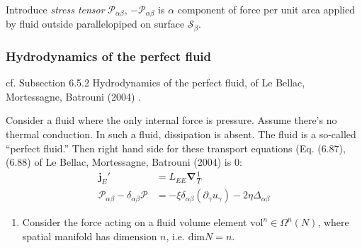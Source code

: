 \documentclass[10pt]{amsart}
\begin{document}
\begin{multicols*}{2}
Introduce \emph{stress tensor} $\mathcal{P}_{\alpha \beta}$, $-\mathcal{P}_{\alpha \beta}$ is $\alpha$ component of force per unit area applied by fluid outside parallelopiped on surface $\mathcal{S}_{\beta}$.  









\subsubsection{Hydrodynamics of the perfect fluid}

cf. Subsection 6.5.2 Hydrodynamics of the perfect fluid, of Le Bellac, Mortessagne, Batrouni (2004) \cite{MLeBellacFMortessagneGBatrouni2004}.  

Consider a fluid where the only internal force is pressure.  Assume there's no thermal conduction.  In such a fluid, dissipation is absent.  The fluid is a so-called ``perfect fluid.''  Then right hand side for these transport equations (Eq. (6.87), (6.88) of Le Bellac, Mortessagne, Batrouni (2004) \cite{MLeBellacFMortessagneGBatrouni2004} is $0$:
\[
\begin{aligned}
  \mathbf{j}_E' & = L_{EE} \mathbf{\nabla} \frac{1}{T} \\  
\mathcal{P}_{\alpha \beta} - \delta_{\alpha \beta} \mathcal{P}  & = -\xi \delta_{\alpha \beta} (\partial_{\gamma} u_{\gamma} ) - 2 \eta \Delta_{\alpha \beta}
\end{aligned}
\]

\begin{enumerate}
  \item Consider the force acting on a fluid volume element $\text{vol}^n \in \Omega^n(N)$, where spatial manifold has dimension $n$, i.e. $\text{dim}N =n$.  


\end{enumerate}
\end{multicols*}
\end{document}
